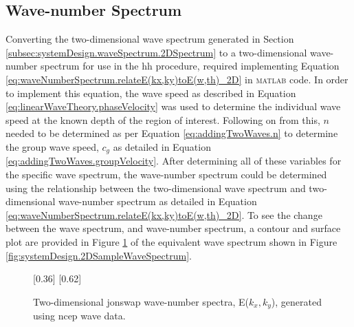 

\subsection{Wave-number Spectrum} \label{subsec:systemDesign.waveSpectrum.waveNumberSpectrum}

Converting the two-dimensional wave spectrum generated in Section \ref{subsec:systemDesign.waveSpectrum.2DSpectrum} to a two-dimensional wave-number spectrum for use in the \ac{hh} procedure, required implementing Equation \ref{eq:waveNumberSpectrum.relateE(kx,ky)toE(w,th)_2D} in \textsc{matlab} code. In order to implement this equation, the wave speed as described in Equation \ref{eq:linearWaveTheory.phaseVelocity} was used to determine the individual wave speed at the known depth of the region of interest. Following on from this, $n$ needed to be determined as per Equation \ref{eq:addingTwoWaves.n} to determine the group wave speed, $c_{g}$ as detailed in Equation \ref{eq:addingTwoWaves.groupVelocity}. After determining all of these variables for the specific wave spectrum, the wave-number spectrum could be determined using the relationship between the two-dimensional wave spectrum and two-dimensional wave-number spectrum as detailed in Equation \ref{eq:waveNumberSpectrum.relateE(kx,ky)toE(w,th)_2D}. To see the change between the wave spectrum, and wave-number spectrum, a contour and surface plot are provided in Figure \ref{fig:systemDesign.2DSampleWaveNumSpectrum} of the equivalent wave spectrum shown in Figure \ref{fig:systemDesign.2DSampleWaveSpectrum}.

\begin{figure} [H]
    \centering
    [0.36\linewidth]{
        \resizebox{\linewidth}{!}{}
    }
    [0.62\linewidth]{
        \resizebox{\linewidth}{!}{}
    }
    \caption{Two-dimensional \acs{jonswap} wave-number spectra, E($k_{x},k_{y}$), generated using \acs{ncep} wave data.}
    \label{fig:systemDesign.2DSampleWaveNumSpectrum}
\end{figure}


